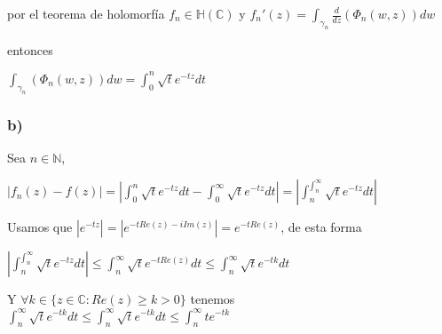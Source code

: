 por el teorema de holomorfía
$f_n \in\mathbb{H}(\mathbb{C})$ y $f_n'(z) = \int_{\gamma_n} \frac{d}{dz} (\Phi_n(w,z)) dw$

entonces

$\int_{\gamma_n}(\Phi_n(w,z)) dw = \int_0^n \sqrt{t}e^{-tz} dt$


\subsubsection{b)}
Sea $n\in\mathbb{N}$,

$|f_n(z) - f(z)| = |\int_{0}^{n} \sqrt{t} e^{-tz}dt - \int_{0}^{\infty} \sqrt{t}e^{-tz}dt| = |\int_{n}^{\int_n^{\infty}} \sqrt{t} e^{-tz}dt|$

Usamos que 
$|e^{-tz}| = |e^{-tRe(z)-iIm(z)}| = e^{-tRe(z)}$, de esta forma


$|\int_{n}^{\int_n^{\infty}} \sqrt{t} e^{-tz}dt| \leq \int_{n}^{\infty} \sqrt{t}e^{-tRe(z)} dt \leq \int_{n}^{\infty} \sqrt{t}e^{-tk}dt $


Y $\forall k\in \{ z\in\mathbb{C} : Re(z)\geq k > 0 \}$ tenemos
$\int_{n}^{\infty} \sqrt{t}e^{-tk}dt \leq \int_{n}^{\infty} \sqrt{t}e^{-tk} dt \leq \int_{n}^{\infty} te^{-tk}$


